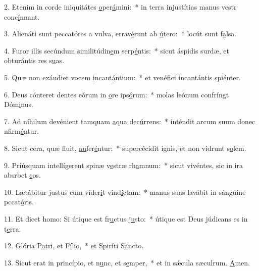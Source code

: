 2. Etenim in corde iniquitátes \uline{o}per\uline{á}mini:~* in terra injustítias manus vestr conc\uline{í}nnant.\par 
3. Alienáti sunt peccatóres a vulva, errav\uline{é}runt ab \uline{ú}tero:~* locút sunt f\uline{a}lsa.\par 
4. Furor illis secúndum similitúdin\uline{e}m serp\uline{é}ntis:~* sicut áspidis surdæ, et obturántis res s\uline{u}as.\par 
5. Quæ non exáudiet vocem \uline{i}ncant\uline{á}ntium:~* et venéfici incantántis spi\uline{é}nter.\par 
6. Deus cónteret dentes eórum in \uline{o}re ips\uline{ó}rum:~* molas leónum confríngt Dóm\uline{i}nus.\par 
7. Ad níhilum devénient tamquam \uline{a}qua dec\uline{ú}rrens:~* inténdit arcum suum donec nfirm\uline{é}ntur.\par 
8. Sicut cera, quæ fluit, \uline{au}fer\uline{é}ntur:~* supercécidit ignis, et non vidrunt s\uline{o}lem.\par 
9. Priúsquam intellígerent spinæ v\uline{e}stræ rh\uline{a}mnum:~* sicut vivéntes, sic in ira absrbet \uline{e}os.\par 
10. Lætábitur justus cum víder\uline{i}t vind\uline{í}ctam:~* manus suas lavábit in sánguine pccat\uline{ó}ris.\par 
11. Et dicet homo: Si útique est fr\uline{u}ctus j\uline{u}sto:~* útique est Deus júdicans es in t\uline{e}rra.\par 
12. Glória P\uline{a}tri, et F\uline{í}lio,~* et Spiríti S\uline{a}ncto.\par 
13. Sicut erat in princípio, et n\uline{u}nc, et s\uline{e}mper,~* et in sǽcula sæculrum. \uline{A}men.\par 
